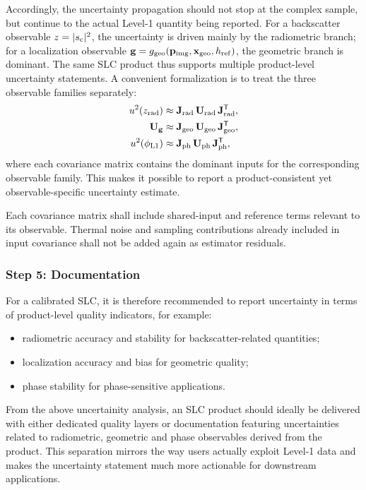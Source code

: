 Accordingly, the uncertainty propagation should not stop at the complex sample,
but continue to the actual Level-1 quantity being reported. For a backscatter
observable $z = |s_{\rm c}|^2$, the uncertainty is driven mainly by the
radiometric branch; for a localization observable $\mathbf{g}=g_{\rm geo}(\mathbf p_{\rm img},\mathbf x_{\rm geo},h_{\rm ref})$,
the geometric branch is dominant. The same \ac{SLC} product thus supports
multiple product-level uncertainty statements. A convenient formalization is
to treat the three observable families separately:
\begin{align}
  u^{2}(z_{\rm rad}) &\approx \mathbf{J}_{\rm rad}\, \mathbf{U}_{\rm rad}\,
  \mathbf{J}_{\rm rad}^{\mathsf{T}}, \\
  \mathbf{U}_{\mathbf{g}} &\approx \mathbf{J}_{\rm geo}\, \mathbf{U}_{\rm geo}\,
  \mathbf{J}_{\rm geo}^{\mathsf{T}}, \\
  u^{2}(\phi_{\rm L1}) &\approx \mathbf{J}_{\rm ph}\, \mathbf{U}_{\rm ph}\,
  \mathbf{J}_{\rm ph}^{\mathsf{T}},
  \label{eq:slc_three_branches_proposed}
\end{align}
where each covariance matrix contains the dominant inputs for the corresponding
observable family. This makes it possible to report a product-consistent yet
observable-specific uncertainty estimate.


Each covariance matrix shall include shared-input and reference terms relevant
to its observable. Thermal noise and sampling contributions already
included in input covariance shall not be added again as estimator residuals.


\subsubsection{Step 5: Documentation}

For a calibrated \ac{SLC}, it is therefore recommended to report uncertainty in
terms of product-level quality indicators, for example:
\begin{itemize}
  \item radiometric accuracy and stability for backscatter-related quantities;
  \item localization accuracy and bias for geometric quality;
  \item phase stability for phase-sensitive applications.
\end{itemize}

From the above uncertainity analysis, an SLC product should ideally be delivered with either dedicated quality layers or documentation featuring uncertainties related to radiometric, geometric and phase observables derived from the product. This separation mirrors the way users actually exploit Level-1 data and makes the uncertainty statement much more actionable for downstream applications.

